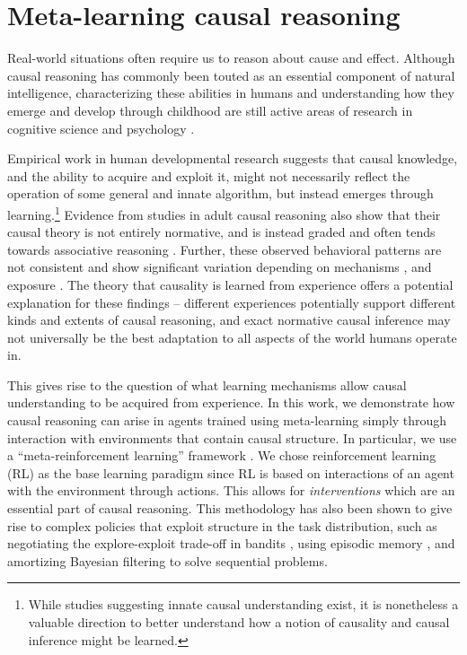 \section{Meta-learning causal reasoning}

Real-world situations often require us to reason about cause and effect. Although causal reasoning has commonly been touted as an essential component of natural intelligence, characterizing these abilities in humans and understanding how they emerge and develop through childhood are still active areas of research in cognitive science and psychology \citep{waldmann2013causal, cartwright2004causation}. 

Empirical work in human developmental research suggests that causal knowledge, and the ability to acquire and exploit it, might not necessarily reflect the operation of some general and innate algorithm, but instead emerges through learning\citep{saxe2006perception, meltzoff2007infants, bonawitz2010just, carey2009origin}.\footnote{While studies suggesting innate causal understanding exist\citep{liu2019origins, schulz2007preschool}, it is nonetheless a valuable direction to better understand how a notion of causality and causal inference might be learned.} Evidence from studies in adult causal reasoning also show that their causal theory is not entirely normative, and is instead graded and often tends towards associative reasoning \citep{rehder2014independence, rehder2017failures, fernbach2010neglect, fernbach2013cognitive}. Further, these observed behavioral patterns are not consistent and show significant variation depending on mechanisms \citep{lombrozo2010causal}, and exposure \citep{krynski2007role}. The theory that causality is learned from experience offers a potential explanation for these findings -- different experiences potentially support different kinds and extents of causal reasoning, and exact normative causal inference may not universally be the best adaptation to all aspects of the world humans operate in.

This gives rise to the question of what learning mechanisms allow causal understanding to be acquired from experience. In this work, we demonstrate how causal reasoning can arise in agents trained using meta-learning
simply through interaction with environments that contain causal structure. In particular, we use a ``meta-reinforcement learning'' framework \citep{duan2016RL2,wang2016}. We chose reinforcement learning (RL) as the base learning paradigm since RL is based on interactions of an agent with the environment through actions. This allows for \textit{interventions} which are an essential part of causal reasoning. This methodology has also been shown to give rise to complex policies that exploit structure in the task distribution, such as negotiating the explore-exploit trade-off in bandits \citep{wang2016, wang2018}, using episodic memory \citep{ritter2018been}, and amortizing Bayesian filtering to solve sequential problems\citep{ortega2019meta}.

